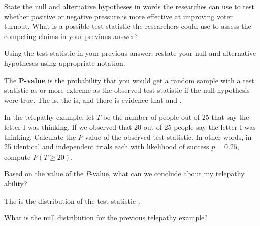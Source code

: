 \bb
\ii State the null and alternative hypotheses in words the researches can use to test whether positive or negative pressure is more effective at improving voter turnout.
\vfill
\ii What is a possible test statistic the researchers could use to assess the competing claims in your previous answer?
\vfill

\ii Using the test statistic in your previous answer, restate your null and alternative hypotheses using appropriate notation.
\vfill
\ee 
\ee

\clearpage


\bbox
\bi
\ii The \textbf{$\mathbf{P}$-value} is the probability that you would get a random sample with a test statistic as or more extreme
as the observed test statistic if the null hypothesis were true.
\ii The  is, the  is, and there is evidence that  and .
\ii \textbf{}
\ei
\ebox

\bb[resume]
\ii In the telepathy example, let $T$ be the number of people out of 25 that say the letter I was thinking.  If we observed that 20 out of 25 people say the letter I was thinking.
\bb
\ii Calculate the $P$-value of the observed test statistic. In other words, in 25 identical and independent trials each with likelihood of success $p = 0.25$, compute $P(T \geq 20)$.

\vfill

\ii Based on the value of the $P$-value, what can we conclude about my telepathy ability?

\vspace{1.25in}

\ee
\ee

\bbox
The \textbf{} is the distribution of the test statistic .
\ebox

\bb[resume]
\ii What is the null distribution for the previous telepathy example?
\vspace{1.25in}
\ee

